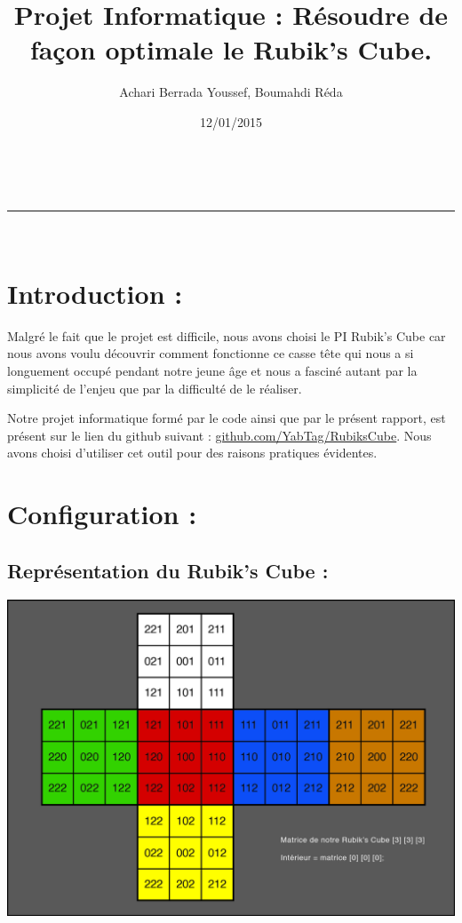 \documentclass[a4paper,11pt]{article}
\makeatletter
\newcommand{\linia}{\rule{\linewidth}{0.5pt}}
\theoremstyle{mytheor}
\renewcommand{\maketitle}{
\begin{center}
\vspace{2ex}
{\huge \textsc{\@title}}
\vspace{1ex}
\\
\linia\\
\@author \hfill \@date
\vspace{4ex}
\end{center}
}
\makeatother
\begin{document}
\title{Projet Informatique : Résoudre de façon optimale le Rubik's Cube.}

\author{Achari Berrada Youssef, Boumahdi Réda}

\date{12/01/2015}

\maketitle



\section*{Introduction :}
Malgré le fait que le projet est difficile, nous avons choisi le PI Rubik's Cube car nous avons voulu découvrir comment fonctionne ce casse tête qui nous a si longuement occupé pendant notre jeune âge et nous a fasciné autant par la simplicité de l'enjeu que par la difficulté de le réaliser.

Notre projet informatique formé par le code ainsi que par le présent rapport, est présent sur le lien du github suivant : \underline{\href{https://github.com/YabTag/RubiksCube}{github.com/YabTag/RubiksCube}}. Nous avons choisi d'utiliser cet outil pour des raisons pratiques évidentes.

\section{Configuration :}

\subsection{Représentation du Rubik's Cube : }

\includegraphics[scale=0.25]{RubiksCube2.jpg}
\end{document}

